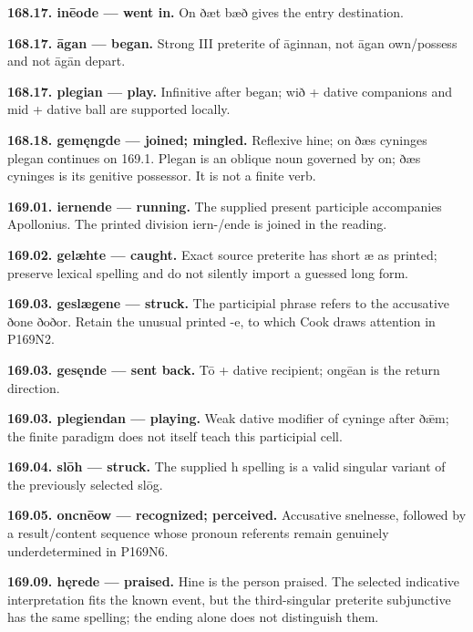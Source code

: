 \textbf{168.17. inēode — went in.} On ðæt bæð gives the entry destination.

\textbf{168.17. āgan — began.} Strong III preterite of āginnan, not āgan own/\allowbreak{}possess and not āgān depart.

\textbf{168.17. plegian — play.} Infinitive after began; wið + dative companions and mid + dative ball are supported locally.

\textbf{168.18. gemęngde — joined; mingled.} Reflexive hine; on ðæs cyninges plegan continues on 169.1. Plegan is an oblique noun governed by on; ðæs cyninges is its genitive possessor. It is not a finite verb.

\textbf{169.01. iernende — running.} The supplied present participle accompanies Apollonius. The printed division iern-/\allowbreak{}ende is joined in the reading.

\textbf{169.02. gelæhte — caught.} Exact source preterite has short æ as printed; preserve lexical spelling and do not silently import a guessed long form.

\textbf{169.03. geslægene — struck.} The participial phrase refers to the accusative ðone ðoðor. Retain the unusual printed -e, to which Cook draws attention in P169N2.

\textbf{169.03. gesęnde — sent back.} Tō + dative recipient; ongēan is the return direction.

\textbf{169.03. plegiendan — playing.} Weak dative modifier of cyninge after ðǣm; the finite paradigm does not itself teach this participial cell.

\textbf{169.04. slōh — struck.} The supplied h spelling is a valid singular variant of the previously selected slōg.

\textbf{169.05. oncnēow — recognized; perceived.} Accusative snelnesse, followed by a result/\allowbreak{}content sequence whose pronoun referents remain genuinely underdetermined in P169N6.

\textbf{169.09. hęrede — praised.} Hine is the person praised. The selected indicative interpretation fits the known event, but the third-singular preterite subjunctive has the same spelling; the ending alone does not distinguish them.

